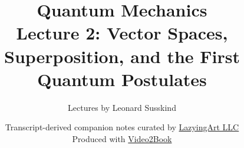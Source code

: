 \documentclass[11pt,oneside]{book}
\begin{document}
\hypersetup{pageanchor=false}
\frontmatter
\title{Quantum Mechanics\\[0.45em]
\large Lecture 2: Vector Spaces, Superposition, and the First Quantum Postulates}
\author{Lectures by Leonard Susskind}
\date{Transcript-derived companion notes curated by
\href{https://lazying.art}{LazyingArt LLC}\\[0.35em]
\small Produced with
\href{https://github.com/lachlanchen/Video2Book}{Video2Book}}
\maketitle
\hypersetup{pageanchor=true}
\mainmatter

\end{document}
